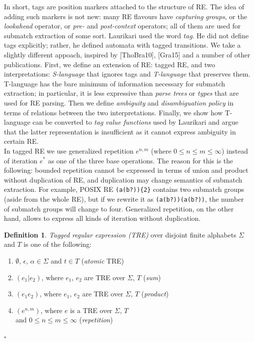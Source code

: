 \documentclass{article}
\newcommand{\Xin}{\!\in\!}
\theoremstyle{definition}
\newtheorem{Xdef}{Definition}
\begin{document}
\begin{multicols}{2}
In short, tags are position markers attached to the structure of RE.
The idea of adding such markers is not new:
many RE flavours have \emph{capturing groups}, or the \emph{lookahead} operator, or \emph{pre-} and \emph{post-context} operators;
all of them are used for submatch extraction of some sort.
Laurikari used the word \emph{tag}.
He did not define tags explicitly; rather, he defined automata with tagged transitions.
We take a slightly different appoach, inspired by [ThoBra10], [Gra15] and a number of other publications.
First, we define an extension of RE: tagged RE,
and two interpretations: \emph{S-language} that ignores tags and \emph{T-language} that preserves them.
T-language has the bare minimum of information necessary for submatch extraction;
in particular, it is less expressive than \emph{parse trees} or \emph{types} that are used for RE parsing.
Then we define \emph{ambiguity} and \emph{disambiguation policy} in terms of relations between the two interpretations.
Finally, we show how T-language can be converted to \emph{tag value functions} used by Laurikari
and argue that the latter representation is insufficient as it cannot express ambiguity in certain RE.
\\

In tagged RE we use generalized repetition $e^{n,m}$ (where $0 \!\leq\! n \!\leq\! m \!\leq\! \infty$)
instead of iteration $e^*$ as one of the three base operations.
The reason for this is the following:
bounded repetition cannot be expressed in terms of union and product without duplication of RE,
and duplication may change semantics of submatch extraction.
For example, POSIX RE \texttt{(a(b?))\{2\}} contains two submatch groups (aside from the whole RE),
but if we rewrite it as \texttt{(a(b?))(a(b?))}, the number of submatch groups will change to four.
Generalized repetition, on the other hand, allows to express all kinds of iteration without duplication.
\\

    \begin{Xdef}\label{tre}
    \emph{Tagged regular expression (TRE)} over disjoint finite alphabets $\Sigma$ and $T$ is one of the following:
    \begin{enumerate}
        \medskip
        \item[] $\emptyset$, $\epsilon$, $\alpha \Xin \Sigma$ and $t \Xin T$ (\emph{atomic} TRE)
        \item[] $(e_1 | e_2)$, where $e_1$, $e_2$ are TRE over $\Sigma$, $T$ (\emph{sum})
        \item[] $(e_1 e_2)$,   where $e_1$, $e_2$ are TRE over $\Sigma$, $T$ (\emph{product})
        \item[] $(e^{n,m})$,   where $e$ is a TRE over $\Sigma$, $T$ \\
            \hphantom{\qquad} and $0 \!\leq\! n \!\leq\! m \!\leq\! \infty$ (\emph{repetition})
        \medskip
    \end{enumerate}
    $\square$
    \end{Xdef}


\end{multicols}
\end{document}
